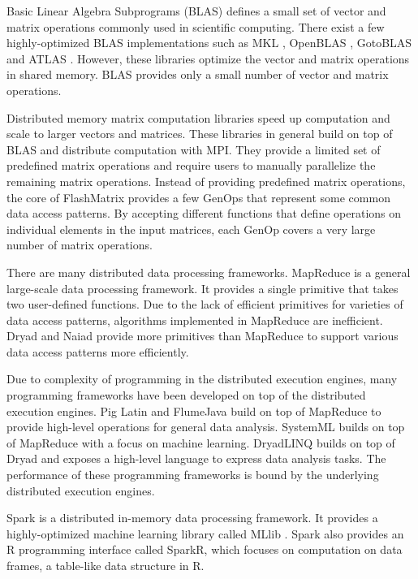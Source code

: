 Basic Linear Algebra Subprograms (BLAS) defines a small set of vector and
matrix operations commonly used in scientific computing. There exist a few
highly-optimized BLAS implementations such as MKL \cite{mkl}, OpenBLAS
\cite{openblas}, GotoBLAS \cite{Goto} and ATLAS \cite{atlas}. However, these
libraries optimize the vector and matrix operations in shared memory. BLAS
provides only a small number of vector and matrix operations.

Distributed memory matrix computation libraries \cite{trilinos, petsc, elemental}
speed up computation and scale to larger vectors and matrices. These libraries
in general build on top of BLAS and distribute computation with MPI.
They provide a limited set of predefined matrix operations and
require users to manually parallelize the remaining matrix operations. Instead
of providing predefined matrix operations, the core of FlashMatrix provides
a few GenOps that represent some common data access patterns. By accepting
different functions that define operations on individual elements in the input
matrices, each GenOp covers a very large number of matrix operations.

There are many distributed data processing frameworks.
MapReduce \cite{mapreduce} is a general large-scale data processing framework.
It provides a single primitive that takes two user-defined functions. 
Due to the lack of
efficient primitives for varieties of data access patterns, algorithms
implemented in MapReduce are inefficient. Dryad \cite{dryad} and
Naiad \cite{naiad} provide more primitives than MapReduce to support various
data access patterns more efficiently.

Due to complexity of programming in the distributed execution engines, many
programming frameworks have been developed on top of the distributed execution
engines. Pig Latin \cite{pig} and FlumeJava \cite{flumejava} build on top of
MapReduce to provide high-level operations for general data analysis. SystemML
\cite{systemml} builds on top of MapReduce with a focus on machine learning.
DryadLINQ \cite{dryadlinq} builds on top of Dryad and exposes a high-level
language to express data analysis tasks. The performance of these programming
frameworks is bound by the underlying distributed execution engines.

Spark \cite{spark} is a distributed in-memory data processing framework.
It provides a highly-optimized machine learning library called MLlib \cite{mllib}.
Spark also provides an R programming interface called SparkR, which
focuses on computation on data frames, a table-like data structure in R.

